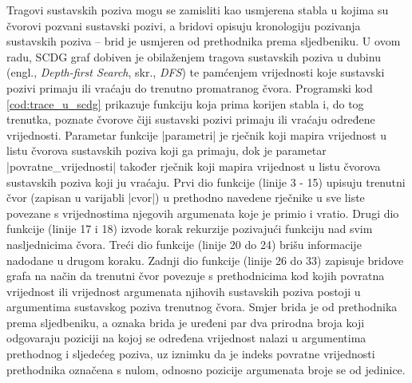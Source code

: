 Tragovi sustavskih poziva mogu se zamisliti kao usmjerena stabla u kojima su
čvorovi pozvani sustavski pozivi, a bridovi opisuju kronologiju pozivanja
sustavskih poziva -- brid je usmjeren od prethodnika prema sljedbeniku. U ovom
radu, SCDG graf dobiven je obilaženjem tragova sustavskih poziva u dubinu
(engl., \textit{Depth-first Search}, skr., \textit{DFS}) te pamćenjem
vrijednosti koje sustavski pozivi primaju ili vraćaju do trenutno promatranog
čvora. Programski kod \ref{cod:trace_u_scdg} prikazuje funkciju koja prima
korijen stabla i, do tog trenutka, poznate čvorove čiji sustavski pozivi primaju
ili vraćaju određene vrijednosti. Parametar funkcije \inlinecode|parametri| je
rječnik koji mapira vrijednost u listu čvorova sustavskih poziva koji ga
primaju, dok je parametar \inlinecode|povratne_vrijednosti| također rječnik 
koji mapira vrijednost u listu čvorova sustavskih poziva koji ju vraćaju.
Prvi dio funkcije (linije 3 - 15) upisuju trenutni čvor (zapisan u varijabli
\inlinecode|cvor|) u prethodno navedene rječnike u sve liste povezane s
vrijednostima njegovih argumenata koje je primio i vratio. Drugi dio funkcije
(linije 17 i 18) izvode korak rekurzije pozivajući funkciju nad svim
nasljednicima čvora. Treći dio funkcije (linije 20 do 24) brišu informacije
nadodane u drugom koraku. Zadnji dio funkcije (linije 26 do 33) zapisuje 
bridove grafa na način da trenutni čvor povezuje s prethodnicima kod kojih
povratna vrijednost ili vrijednost argumenata njihovih sustavskih poziva postoji
u argumentima sustavskog poziva trenutnog čvora. Smjer brida je od prethodnika
prema sljedbeniku, a oznaka brida je uređeni par dva prirodna broja koji
odgovaraju poziciji na kojoj se određena vrijednost nalazi u argumentima
prethodnog i sljedećeg poziva, uz iznimku da je indeks povratne vrijednosti 
prethodnika označena s nulom, odnosno pozicije argumenata broje se od jedinice. 
\\


